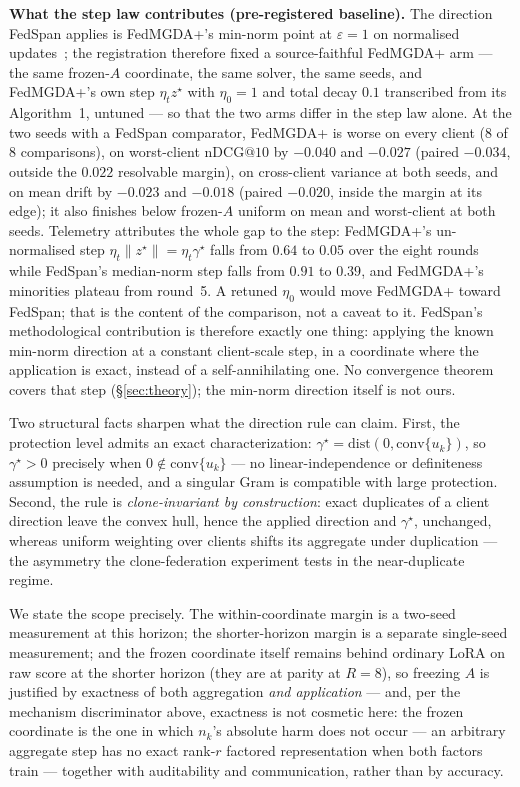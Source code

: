 \documentclass[sigconf,anonymous,review]{acmart}
\makeatletter
\newcommand{\ndcg}{\mathrm{nDCG@10}}
\makeatother
\begin{document}
\textbf{What the step law contributes (pre-registered baseline).} The direction FedSpan applies is FedMGDA+'s min-norm point at $\varepsilon{=}1$ on normalised updates~\cite{hu2020fedmgda}; the registration therefore fixed a source-faithful FedMGDA+ arm --- the same frozen-$A$ coordinate, the same solver, the same seeds, and FedMGDA+'s own step $\eta_t z^\star$ with $\eta_0{=}1$ and total decay $0.1$ transcribed from its Algorithm~1, untuned --- so that the two arms differ in the step law alone. At the two seeds with a FedSpan comparator, FedMGDA+ is worse on every client (8 of 8 comparisons), on worst-client $\ndcg$ by $-0.040$ and $-0.027$ (paired $-0.034$, outside the $0.022$ resolvable margin), on cross-client variance at both seeds, and on mean drift by $-0.023$ and $-0.018$ (paired $-0.020$, inside the margin at its edge); it also finishes below frozen-$A$ uniform on mean and worst-client at both seeds. Telemetry attributes the whole gap to the step: FedMGDA+'s un-normalised step $\eta_t\|z^\star\|=\eta_t\gamma^\star$ falls from $0.64$ to $0.05$ over the eight rounds while FedSpan's median-norm step falls from $0.91$ to $0.39$, and FedMGDA+'s minorities plateau from round~5. A retuned $\eta_0$ would move FedMGDA+ toward FedSpan; that is the content of the comparison, not a caveat to it. FedSpan's methodological contribution is therefore exactly one thing: applying the known min-norm direction at a constant client-scale step, in a coordinate where the application is exact, instead of a self-annihilating one. No convergence theorem covers that step (\S\ref{sec:theory}); the min-norm direction itself is not ours.

Two structural facts sharpen what the direction rule can claim. First, the protection level admits an exact characterization: $\gamma^\star = \mathrm{dist}(0, \mathrm{conv}\{u_k\})$, so $\gamma^\star > 0$ precisely when $0 \notin \mathrm{conv}\{u_k\}$ --- no linear-independence or definiteness assumption is needed, and a singular Gram is compatible with large protection. Second, the rule is \emph{clone-invariant by construction}: exact duplicates of a client direction leave the convex hull, hence the applied direction and $\gamma^\star$, unchanged, whereas uniform weighting over clients shifts its aggregate under duplication --- the asymmetry the clone-federation experiment tests in the near-duplicate regime.

We state the scope precisely. The within-coordinate margin is a two-seed measurement at this horizon; the shorter-horizon margin is a separate single-seed measurement; and the frozen coordinate itself remains behind ordinary LoRA on raw score at the shorter horizon (they are at parity at $R{=}8$), so freezing $A$ is justified by exactness of both aggregation \emph{and application} --- and, per the mechanism discriminator above, exactness is not cosmetic here: the frozen coordinate is the one in which $n_k$'s absolute harm does not occur --- an arbitrary aggregate step has no exact rank-$r$ factored representation when both factors train --- together with auditability and communication, rather than by accuracy.
\end{document}
